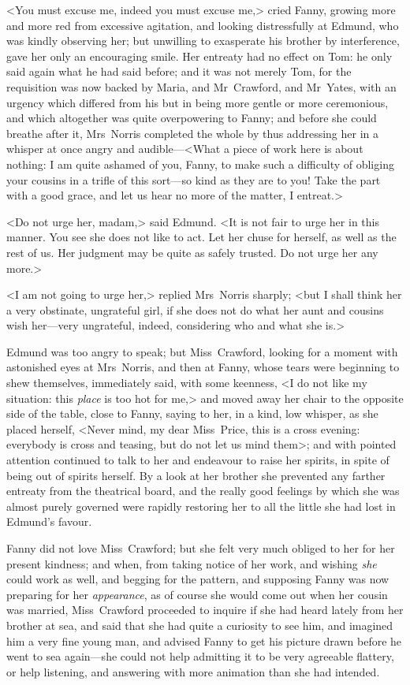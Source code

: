 <You must excuse me, indeed you must excuse me,> cried Fanny, growing more and more red from excessive agitation, and looking distressfully at Edmund, who was kindly observing her; but unwilling to exasperate his brother by interference, gave her only an encouraging smile. Her entreaty had no effect on Tom: he only said again what he had said before; and it was not merely Tom, for the requisition was now backed by Maria, and Mr~Crawford, and Mr~Yates, with an urgency which differed from his but in being more gentle or more ceremonious, and which altogether was quite overpowering to Fanny; and before she could breathe after it, Mrs~Norris completed the whole by thus addressing her in a whisper at once angry and audible—<What a piece of work here is about nothing: I am quite ashamed of you, Fanny, to make such a difficulty of obliging your cousins in a trifle of this sort—so kind as they are to you! Take the part with a good grace, and let us hear no more of the matter, I entreat.>

<Do not urge her, madam,> said Edmund. <It is not fair to urge her in this manner. You see she does not like to act. Let her chuse for herself, as well as the rest of us. Her judgment may be quite as safely trusted. Do not urge her any more.>

<I am not going to urge her,> replied Mrs~Norris sharply; <but I shall think her a very obstinate, ungrateful girl, if she does not do what her aunt and cousins wish her—very ungrateful, indeed, considering who and what she is.>

Edmund was too angry to speak; but Miss~Crawford, looking for a moment with astonished eyes at Mrs~Norris, and then at Fanny, whose tears were beginning to shew themselves, immediately said, with some keenness, <I do not like my situation: this \textit{place}  is too hot for me,> and moved away her chair to the opposite side of the table, close to Fanny, saying to her, in a kind, low whisper, as she placed herself, <Never mind, my dear Miss~Price, this is a cross evening: everybody is cross and teasing, but do not let us mind them>; and with pointed attention continued to talk to her and endeavour to raise her spirits, in spite of being out of spirits herself. By a look at her brother she prevented any farther entreaty from the theatrical board, and the really good feelings by which she was almost purely governed were rapidly restoring her to all the little she had lost in Edmund's favour.

Fanny did not love Miss~Crawford; but she felt very much obliged to her for her present kindness; and when, from taking notice of her work, and wishing \textit{she}  could work as well, and begging for the pattern, and supposing Fanny was now preparing for her \textit{appearance}, as of course she would come out when her cousin was married, Miss~Crawford proceeded to inquire if she had heard lately from her brother at sea, and said that she had quite a curiosity to see him, and imagined him a very fine young man, and advised Fanny to get his picture drawn before he went to sea again—she could not help admitting it to be very agreeable flattery, or help listening, and answering with more animation than she had intended.

